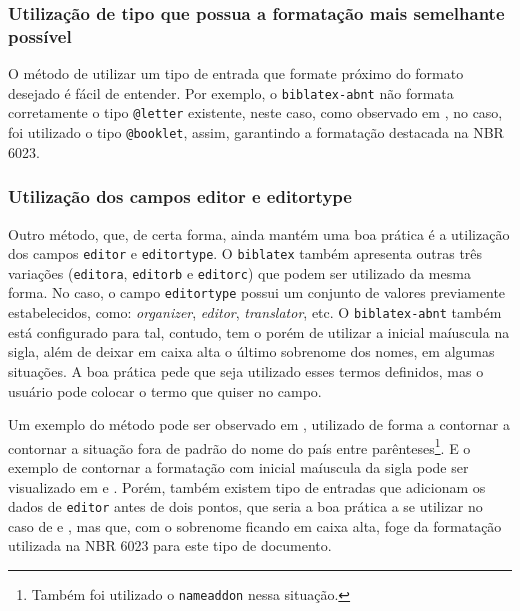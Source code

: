 \subsubsection{Utilização de tipo que possua a formatação mais semelhante possível}
O método de utilizar um tipo de entrada que formate próximo do formato desejado é fácil de entender. Por exemplo, o \texttt{biblatex-abnt} não formata corretamente o tipo \texttt{@letter} existente, neste caso, como observado em \textcite{correspondencia:ex1}, no caso, foi utilizado o tipo \texttt{@booklet}, assim, garantindo a formatação destacada na NBR 6023. 

\subsubsection{Utilização dos campos editor e editortype}
Outro método, que, de certa forma, ainda mantém uma boa prática é a utilização dos campos \texttt{editor} e \texttt{editortype}. O \texttt{biblatex} também apresenta outras três variações (\texttt{editora}, \texttt{editorb} e \texttt{editorc}) que podem ser utilizado da mesma forma. No caso, o campo \texttt{editortype} possui um conjunto de valores previamente estabelecidos, como: \textit{organizer}, \textit{editor}, \textit{translator}, etc. O \texttt{biblatex-abnt} também está configurado para tal, contudo, tem o porém de utilizar a inicial maíuscula na sigla, além de deixar em caixa alta o último sobrenome dos nomes, em algumas situações. A boa prática pede que seja utilizado esses termos definidos, mas o usuário pode colocar o termo que quiser no campo.

Um exemplo do método pode ser observado em \textcite{parte:ex1}, utilizado de forma a contornar a contornar a situação fora de padrão do nome do país entre parênteses\footnote{Também foi utilizado o \texttt{nameaddon} nessa situação.}. E o exemplo de contornar a formatação com inicial maíuscula da sigla pode ser visualizado em \textcite{parte:ex2} e \textcite{livro:iffar-guia-normalizacao-2022}. Porém, também existem tipo de entradas que adicionam os dados de \texttt{editor} antes de dois pontos, que seria a boa prática a se utilizar no caso de \textcite{filme:bee-movie} e \textcite{serie:grande-familia}, mas que, com o sobrenome ficando em caixa alta, foge da formatação utilizada na NBR 6023 para este tipo de documento.

